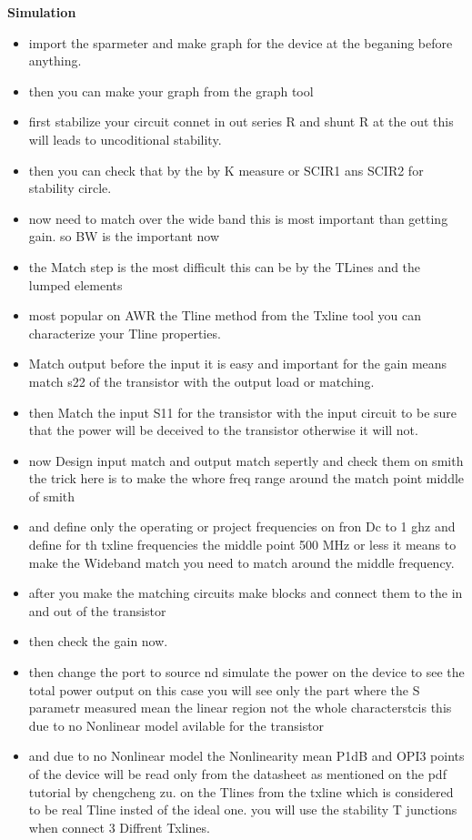 \documentclass{article}
\begin{document}
\textbf{Simulation} 
\begin{itemize}
    
    \item import the sparmeter and make graph for the device at the beganing before anything.
    \item then you can make your graph from the graph tool
    \item first stabilize your circuit connet in out series R and shunt R at the out this will leads to uncoditional stability.
    \item then you can check that by the by K measure or SCIR1 ans SCIR2 for stability circle.
    \item now need to match over the wide band this is most important than getting gain. so BW is the important now
    \item the Match step is the most difficult this can be by the TLines and the lumped elements 
    \item most popular on AWR the Tline method from the Txline tool you can characterize your Tline properties.
    \item Match output before the input it is easy and important for the gain means match s22 of the transistor with the output load or matching.
    \item then Match the input S11 for the transistor with the input circuit to be sure that the power will be deceived to the transistor otherwise it will not.
    \item now Design  input match and output match sepertly and check them on smith the trick here is to make the whore freq range around the match point middle of smith
    \item and define only the operating or project frequencies on fron Dc to 1 ghz and define for th txline frequencies the middle point 500 MHz or less it means to make the Wideband match you need to match around the middle frequency.
    \item after you make the matching circuits make blocks and connect them to the in and out of the transistor 
    \item then check the gain now.
    \item then change the port to source nd simulate the power on the device to see the total power output on this case you will see only the part where the S parametr measured mean the linear region not the whole characterstcis this due to no Nonlinear model avilable for the transistor
    \item and due to no Nonlinear model the Nonlinearity  mean P1dB and OPI3 points of the device will be read only from the datasheet as mentioned on the pdf tutorial by chengcheng zu.
    on the Tlines from the txline which is considered to be real Tline insted of the ideal one.
    you will use the stability T junctions  when connect 3 Diffrent Txlines.
\end{itemize}
\end{document}
